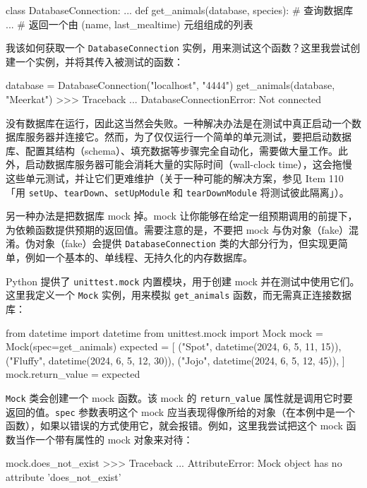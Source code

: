 \begin{codebox}[python]
class DatabaseConnection:
    ...
def get_animals(database, species):
    # 查询数据库
    ...
    # 返回一个由 (name, last_mealtime) 元组组成的列表
\end{codebox}

我该如何获取一个 \texttt{DatabaseConnection} 实例，用来测试这个函数？这里我尝试创建一个实例，并将其传入被测试的函数：

\begin{codebox}[python]
database = DatabaseConnection("localhost", "4444")
get_animals(database, "Meerkat")
>>>
Traceback ...
DatabaseConnectionError: Not connected
\end{codebox}

没有数据库在运行，因此这当然会失败。一种解决办法是在测试中真正启动一个数据库服务器并连接它。然而，为了仅仅运行一个简单的单元测试，要把启动数据库、配置其结构（schema）、填充数据等步骤完全自动化，需要做大量工作。此外，启动数据库服务器可能会消耗大量的实际时间（wall-clock time），这会拖慢这些单元测试，并让它们更难维护（关于一种可能的解决方案，参见 Item 110「用 \texttt{setUp}、\texttt{tearDown}、\texttt{setUpModule} 和 \texttt{tearDownModule} 将测试彼此隔离」）。

另一种办法是把数据库 mock 掉。mock 让你能够在给定一组预期调用的前提下，为依赖函数提供预期的返回值。需要注意的是，不要把 mock 与伪对象（fake）混淆。伪对象（fake）会提供 \texttt{DatabaseConnection} 类的大部分行为，但实现更简单，例如一个基本的、单线程、无持久化的内存数据库。

Python 提供了 \texttt{unittest.mock} 内置模块，用于创建 mock 并在测试中使用它们。这里我定义一个 \texttt{Mock} 实例，用来模拟 \texttt{get\_animals} 函数，而无需真正连接数据库：

\begin{codebox}[python]
from datetime import datetime
from unittest.mock import Mock
mock = Mock(spec=get_animals)
expected = [
    ("Spot", datetime(2024, 6, 5, 11, 15)),
    ("Fluffy", datetime(2024, 6, 5, 12, 30)),
    ("Jojo", datetime(2024, 6, 5, 12, 45)),
]
mock.return_value = expected
\end{codebox}

\texttt{Mock} 类会创建一个 mock 函数。该 mock 的 \texttt{return\_value} 属性就是调用它时要返回的值。\texttt{spec} 参数表明这个 mock 应当表现得像所给的对象（在本例中是一个函数），如果以错误的方式使用它，就会报错。例如，这里我尝试把这个 mock 函数当作一个带有属性的 mock 对象来对待：

\begin{codebox}[python]
mock.does_not_exist
>>>
Traceback ...
AttributeError: Mock object has no attribute 'does_not_exist'
\end{codebox}

